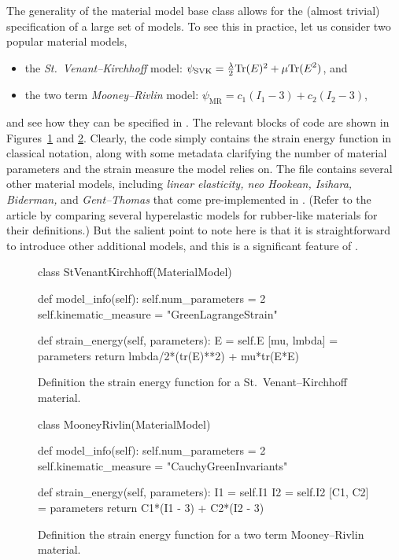 The generality of the material model base class allows for the (almost
trivial) specification of a large set of models. To see this in
practice, let us consider two popular material models,
\begin{itemize}
  \item the {\em St.~Venant--Kirchhoff} model: $\psi_{\mathrm{SVK}} =
  \frac{\lambda}{2}\mathrm{Tr}(\mbox{$ E$})^{2} + \mu\mathrm{Tr}(\mbox{$ E$}^{2})$, and

  \item the two term {\em Mooney--Rivlin} model: $\psi_{\mathrm{MR}} =
  c_{1} (I_{1} - 3) + c_{2} (I_{2} - 3)$,
\end{itemize}
and see how they can be specified in \twist. The relevant blocks of code
are shown in Figures~\ref{code:narayanan:svk} and \ref{code:narayanan:mr}.
Clearly, the code simply contains the strain energy function
in classical notation, along with some metadata clarifying the number
of material parameters and the strain measure the model relies on. The
file  contains several other material models,
including {\em linear elasticity, neo Hookean, Isihara, Biderman,} and
{\em Gent--Thomas} that come pre-implemented in \twist. (Refer to the
article by \citet{MarckmannVerron2006} comparing several hyperelastic
models for rubber-like materials for their definitions.) But the
salient point to note here is that it is straightforward to introduce
other additional models, and this is a significant feature of \twist.

\begin{figure}
\begin{python}
class StVenantKirchhoff(MaterialModel)

  def model_info(self):
    self.num_parameters = 2
    self.kinematic_measure = "GreenLagrangeStrain"

  def strain_energy(self, parameters):
    E = self.E
    [mu, lmbda] = parameters
    return lmbda/2*(tr(E)**2) + mu*tr(E*E)
\end{python}
\caption{Definition the strain energy function for a
  St.~Venant--Kirchhoff material.}
\label{code:narayanan:svk}
\end{figure}

\begin{figure}
\begin{python}
class MooneyRivlin(MaterialModel)

  def model_info(self):
    self.num_parameters = 2
    self.kinematic_measure = "CauchyGreenInvariants"

  def strain_energy(self, parameters):
    I1 = self.I1
    I2 = self.I2
    [C1, C2] = parameters
    return C1*(I1 - 3) + C2*(I2 - 3)
\end{python}
\caption{Definition the strain energy function for a two term
  Mooney--Rivlin material.}
\label{code:narayanan:mr}
\end{figure}

